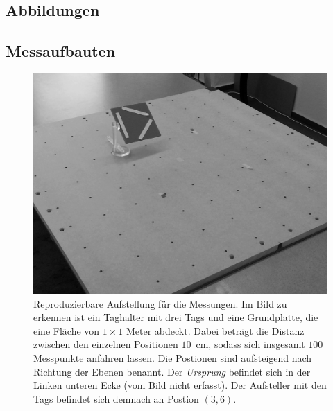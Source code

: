 %
%
%
\begin{appendix}

%

\normalsize
%
\chapter{Abbildungen}
\section{Messaufbauten}
\begin{figure}[h!]
 \centering
         \includegraphics[width=\textwidth]{img/Calibration_Plate1.png}
         \caption[PRPS-Kalibiersystem]{Reproduzierbare Aufstellung für die Messungen. Im Bild zu erkennen ist ein Taghalter mit drei Tags und eine Grundplatte, die eine Fläche von $1\times1$ Meter abdeckt. Dabei beträgt die Distanz zwischen den einzelnen Positionen $10$~cm, sodass sich insgesamt $100$ Messpunkte anfahren lassen. Die Postionen sind aufsteigend nach Richtung der Ebenen benannt. Der \textit{Ursprung} befindet sich in der Linken unteren Ecke (vom Bild nicht erfasst). Der Aufsteller mit den Tags befindet sich demnach an Postion $(3,6)$.}

\end{figure}
\end{appendix}
